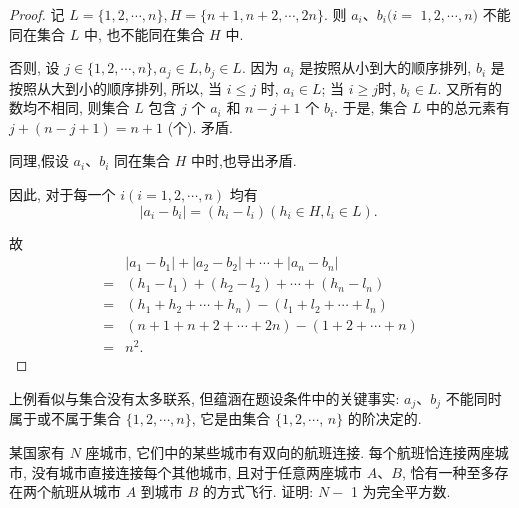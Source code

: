 \begin{proof}
	记 $L=\{1,2, \cdots, n\}, H=\{n+1, n+2, \cdots, 2 n\}$. 则 $a_{i} 、 b_{i}(i=$ $1,2, \cdots, n)$ 不能同在集合 $L$ 中, 也不能同在集合 $H$ 中.

	否则, 设 $j \in\{1,2, \cdots, n\}, a_{j} \in L, b_{j} \in L$. 因为 $a_{i}$ 是按照从小到大的顺序排列, $b_{i}$ 是按照从大到小的顺序排列, 所以, 当 $i \leqslant j$ 时, $a_{i} \in L$; 当 $i \geqslant j$时, $b_{i} \in L$. 又所有的数均不相同, 则集合 $L$ 包含 $j$ 个 $a_{i}$ 和 $n-j+1$ 个 $b_{i}$. 于是, 集合 $L$ 中的总元素有 $j+(n-j+1)=n+1$ (个). 矛盾.

	同理,假设 $a_{i} 、 b_{i}$ 同在集合 $H$ 中时,也导出矛盾.

	因此, 对于每一个 $i(i=1,2, \cdots, n)$ 均有
	$$
		\left|a_{i}-b_{i}\right|=\left(h_{i}-l_{i}\right)\left(h_{i} \in H, l_{i} \in L\right) \text {. }
	$$

	故
	$$
		\begin{aligned}
			  & \left|a_{1}-b_{1}\right|+\left|a_{2}-b_{2}\right|+\cdots+\left|a_{n}-b_{n}\right| \\
			= & \left(h_{1}-l_{1}\right)+\left(h_{2}-l_{2}\right)+\cdots+\left(h_{n}-l_{n}\right) \\
			= & \left(h_{1}+h_{2}+\cdots+h_{n}\right)-\left(l_{1}+l_{2}+\cdots+l_{n}\right)       \\
			= & (n+1+n+2+\cdots+2 n)-(1+2+\cdots+n)                                               \\
			= & n^{2} .
		\end{aligned}
	$$
\end{proof}

\begin{note}
	上例看似与集合没有太多联系, 但蕴涵在题设条件中的关键事实: $a_{j} 、 b_{j}$ 不能同时属于或不属于集合 $\{1,2, \cdots, n\}$, 它是由集合 $\{1,2, \cdots$, $n\}$ 的阶决定的.
\end{note}

\begin{example}
	某国家有 $N$ 座城市, 它们中的某些城市有双向的航班连接. 每个航班恰连接两座城市, 没有城市直接连接每个其他城市, 且对于任意两座城市 $A 、 B$, 恰有一种至多存在两个航班从城市 $A$ 到城市 $B$ 的方式飞行. 证明: $N-$ 1 为完全平方数.
\end{example}

